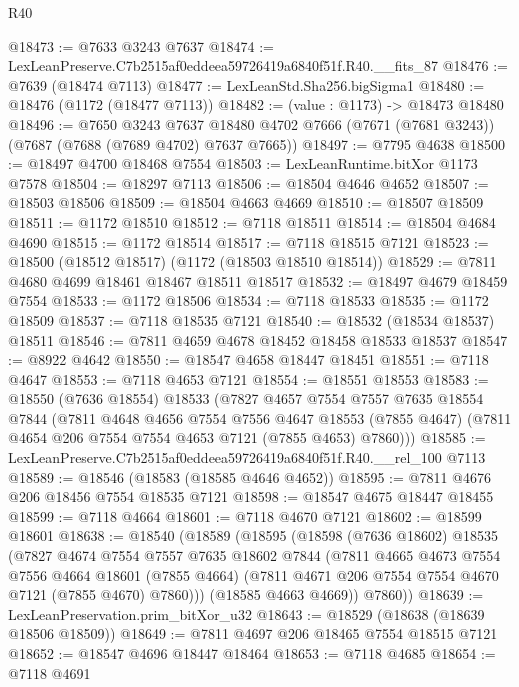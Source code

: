 \begin{lexlean}{R40}
\begin{coremodule}
@18473 := @7633 @3243 @7637
@18474 := LexLeanPreserve.C7b2515af0eddeea59726419a6840f51f.R40.__fits_87
@18476 := @7639 (@18474 @7113)
@18477 := LexLeanStd.Sha256.bigSigma1
@18480 := @18476 (@1172 (@18477 @7113))
@18482 := (value : @1173) -> @18473 @18480
@18496 := @7650
    @3243
    @7637
    @18480
    @4702
    @7666
    (@7671 (@7681 @3243))
    (@7687 (@7688 (@7689 @4702) @7637 @7665))
@18497 := @7795 @4638
@18500 := @18497 @4700 @18468 @7554
@18503 := LexLeanRuntime.bitXor @1173 @7578
@18504 := @18297 @7113
@18506 := @18504 @4646 @4652
@18507 := @18503 @18506
@18509 := @18504 @4663 @4669
@18510 := @18507 @18509
@18511 := @1172 @18510
@18512 := @7118 @18511
@18514 := @18504 @4684 @4690
@18515 := @1172 @18514
@18517 := @7118 @18515 @7121
@18523 := @18500 (@18512 @18517) (@1172 (@18503 @18510 @18514))
@18529 := @7811 @4680 @4699 @18461 @18467 @18511 @18517
@18532 := @18497 @4679 @18459 @7554
@18533 := @1172 @18506
@18534 := @7118 @18533
@18535 := @1172 @18509
@18537 := @7118 @18535 @7121
@18540 := @18532 (@18534 @18537) @18511
@18546 := @7811 @4659 @4678 @18452 @18458 @18533 @18537
@18547 := @8922 @4642
@18550 := @18547 @4658 @18447 @18451
@18551 := @7118 @4647
@18553 := @7118 @4653 @7121
@18554 := @18551 @18553
@18583 := @18550
    (@7636 @18554)
    @18533
    (@7827
      @4657
      @7554
      @7557
      @7635
      @18554
      @7844
      (@7811
        @4648
        @4656
        @7554
        @7556
        @4647
        @18553
        (@7855 @4647)
        (@7811 @4654 @206 @7554 @7554 @4653 @7121 (@7855 @4653) @7860)))
@18585 := LexLeanPreserve.C7b2515af0eddeea59726419a6840f51f.R40.__rel_100 @7113
@18589 := @18546 (@18583 (@18585 @4646 @4652))
@18595 := @7811 @4676 @206 @18456 @7554 @18535 @7121
@18598 := @18547 @4675 @18447 @18455
@18599 := @7118 @4664
@18601 := @7118 @4670 @7121
@18602 := @18599 @18601
@18638 := @18540
    (@18589
      (@18595
        (@18598
          (@7636 @18602)
          @18535
          (@7827
            @4674
            @7554
            @7557
            @7635
            @18602
            @7844
            (@7811
              @4665
              @4673
              @7554
              @7556
              @4664
              @18601
              (@7855 @4664)
              (@7811 @4671 @206 @7554 @7554 @4670 @7121 (@7855 @4670) @7860)))
          (@18585 @4663 @4669))
        @7860))
@18639 := LexLeanPreservation.prim_bitXor_u32
@18643 := @18529 (@18638 (@18639 @18506 @18509))
@18649 := @7811 @4697 @206 @18465 @7554 @18515 @7121
@18652 := @18547 @4696 @18447 @18464
@18653 := @7118 @4685
@18654 := @7118 @4691

\end{coremodule}
\end{lexlean}
